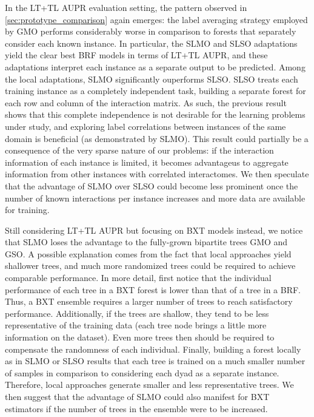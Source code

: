 In the LT+TL AUPR evaluation setting, the pattern observed in \autoref{sec:prototype_comparison} again emerges: the label averaging strategy employed by GMO performs considerably worse in comparison to forests that separately consider each known instance. In particular, the SLMO and SLSO adaptations yield the clear best BRF models in terms of LT+TL AUPR, and these adaptations interpret each instance as a separate output to be predicted. Among the local adaptations, SLMO significantly ouperforms SLSO. SLSO treats each training instance as a completely independent task, building a separate forest for each row and column of the interaction matrix. As such, the previous result shows that this complete independence is not desirable for the learning problems under study, and exploring label correlations between instances of the same domain is beneficial (as demonstrated by SLMO). This result could partially be a consequence of the very sparse nature of our problems: if the interaction information of each instance is limited, it becomes advantageus to aggregate information from other instances with correlated interactomes. We then speculate that the advantage of SLMO over SLSO could become less prominent once the number of known interactions per instance increases and more data are available for training.

Still considering LT+TL AUPR but focusing on BXT models instead, we notice that SLMO loses the advantage to the fully-grown bipartite trees GMO and GSO. A possible explanation comes from the fact that local approaches yield shallower trees, and much more randomized trees could be required to achieve comparable performance. In more detail, first notice that the individual performance of each tree in a BXT forest is lower than that of a tree in a BRF. Thus, a BXT ensemble requires a larger number of trees to reach satisfactory performance. Additionally, if the trees are shallow, they tend to be less representative of the training data (each tree node brings a little more information on the dataset).
Even more trees then should be required to compensate the randomness of each individual. Finally, building a forest locally as in SLMO or SLSO results that each tree is trained on a much smaller number of samples in comparison to considering each dyad as a separate instance. Therefore, local approaches generate smaller and less representative trees. We then suggest that the advantage of SLMO could also manifest for BXT estimators if the number of trees in the ensemble were to be increased.

